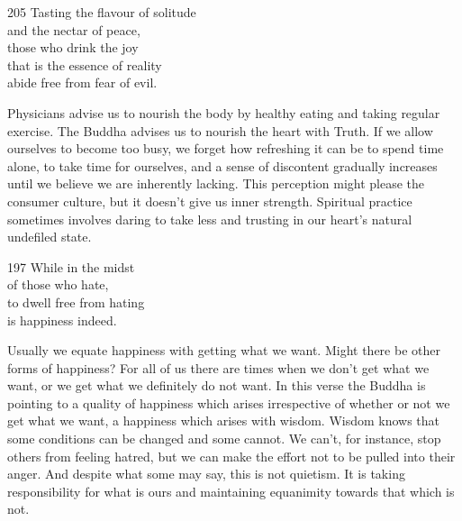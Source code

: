 
\begin{dhpVerse}{205}
\label{dhp-205}
Tasting the flavour of solitude\\
and the nectar of peace,\\
those who drink the joy\\
that is the essence of reality\\
abide free from fear of evil.
\end{dhpVerse}

\begin{dhpRefl}
  Physicians advise us to nourish the body by healthy eating and taking regular
  exercise. The Buddha advises us to nourish the heart with Truth. If we allow
  ourselves to become too busy, we forget how refreshing it can be to spend time
  alone, to take time for ourselves, and a sense of discontent gradually
  increases until we believe we are inherently lacking. This perception might
  please the consumer culture, but it doesn’t give us inner strength. Spiritual
  practice sometimes involves daring to take less and trusting in our heart’s
  natural undefiled state.
\end{dhpRefl}


\begin{dhpVerse}{197}
\label{dhp-197}
While in the midst\\
of those who hate,\\
to dwell free from hating\\
is happiness indeed.
\end{dhpVerse}

\begin{dhpRefl}
  Usually we equate happiness with getting what we want. Might there be other
  forms of happiness? For all of us there are times when we don’t get what we
  want, or we get what we definitely do not want. In this verse the Buddha is
  pointing to a quality of happiness which arises irrespective of whether or not
  we get what we want, a happiness which arises with wisdom. Wisdom knows that
  some conditions can be changed and some cannot. We can’t, for instance, stop
  others from feeling hatred, but we can make the effort not to be pulled into
  their anger. And despite what some may say, this is not quietism. It is taking
  responsibility for what is ours and maintaining equanimity towards that which
  is not.
\end{dhpRefl}


